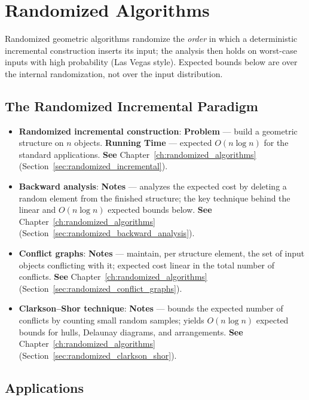 \section{Randomized Algorithms}
\label{sec:app_alg_randomized}

Randomized geometric algorithms randomize the \emph{order} in which a
deterministic incremental construction inserts its input; the analysis
then holds on worst-case inputs with high probability (Las Vegas style).
Expected bounds below are over the internal randomization, not over the
input distribution.

\subsection{The Randomized Incremental Paradigm}
\label{sec:appalgs_randomized_incr}

\begin{itemize}
  \item \textbf{Randomized incremental construction}:
    \textbf{Problem} --- build a geometric structure on $n$ objects.
    \textbf{Running Time} --- expected $O(n\log n)$ for the standard
    applications. \textbf{See} Chapter~\ref{ch:randomized_algorithms}
    (Section~\ref{sec:randomized_incremental}).
  \item \textbf{Backward analysis}: \textbf{Notes} ---
    analyzes the expected cost by deleting a random element from the
    finished structure; the key technique behind the linear and
    $O(n\log n)$ expected bounds below. \textbf{See}
    Chapter~\ref{ch:randomized_algorithms}
    (Section~\ref{sec:randomized_backward_analysis}).
  \item \textbf{Conflict graphs}: \textbf{Notes} ---
    maintain, per structure element, the set of input objects conflicting
    with it; expected cost linear in the total number of conflicts.
    \textbf{See} Chapter~\ref{ch:randomized_algorithms}
    (Section~\ref{sec:randomized_conflict_graphs}).
  \item \textbf{Clarkson--Shor technique}:
    \textbf{Notes} --- bounds the expected number of conflicts by counting
    small random samples; yields $O(n\log n)$ expected bounds for hulls,
    Delaunay diagrams, and arrangements. \textbf{See}
    Chapter~\ref{ch:randomized_algorithms}
    (Section~\ref{sec:randomized_clarkson_shor}).
\end{itemize}

\subsection{Applications}
\label{sec:appalgs_randomized_apps}


